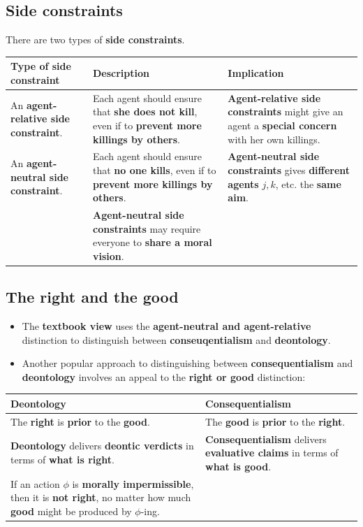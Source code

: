 \documentclass[11pt]{article}
\begin{document}
 \newpage
\subsection{Side constraints}
\label{sec:org54a83c9}
There are two types of \textbf{side constraints}.
\begin{center}
\begin{tabularx}{\textwidth}{|X|X|X|}
\hline
Type of side constraint & Description & Implication\\
\hline
An \textbf{agent-relative side constraint}. & Each agent should ensure that \textbf{she does not kill}, even if to \textbf{prevent more killings by others}. & \textbf{Agent-relative side constraints} might give an agent a \textbf{special concern} with her own killings.\\
\hline
An \textbf{agent-neutral side constraint}. & Each agent should ensure that \textbf{no one kills}, even if to \textbf{prevent more killings by others}. & \textbf{Agent-neutral side constraints} gives \textbf{different agents} \(j, k\), etc. the \textbf{same aim}.\\
 & \textbf{Agent-neutral side constraints} may require everyone to \textbf{share a moral vision}. & \\
\hline
\end{tabularx}
\end{center}
\subsection{The right and the good}
\label{sec:orgc0a0969}
\begin{itemize}
\item The \textbf{textbook view} uses the \textbf{agent-neutral and agent-relative} distinction to distinguish between \textbf{conseuqentialism} and \textbf{deontology}.
\item Another popular approach to distinguishing between \textbf{consequentialism} and \textbf{deontology} involves an appeal to the \textbf{right or good} distinction:
\end{itemize}
\begin{center}
\begin{tabularx}{\textwidth}{|X|X|}
\hline
Deontology & Consequentialism\\
\hline
The \textbf{right} is \textbf{prior} to the \textbf{good}. & The \textbf{good} is \textbf{prior} to the \textbf{right}.\\
\hline
\textbf{Deontology} delivers \textbf{deontic verdicts} in terms of \textbf{what is right}. & \textbf{Consequentialism} delivers \textbf{evaluative claims} in terms of \textbf{what is good}.\\
If an action \(\phi\) is \textbf{morally impermissible}, then it is \textbf{not right}, no matter how much \textbf{good} might be produced by \(\phi\)-ing. & \\
\hline
\end{tabularx}
\end{center}
\end{document}
